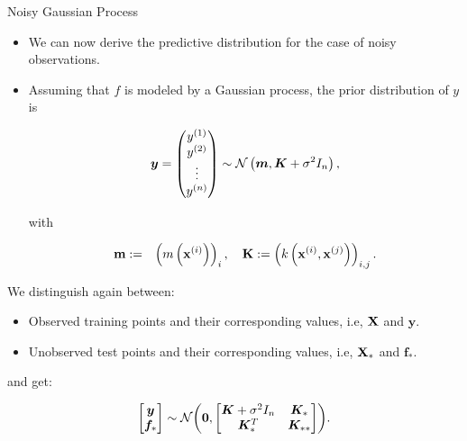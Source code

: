\begin{frame}[c,allowframebreaks]{Noisy Gaussian Process}
\framebreak

\begin{itemize}
  \item We can now derive the predictive distribution for the case of noisy observations. 
  \item Assuming that $f$ is modeled by a Gaussian process, the prior distribution of $y$ is
  
  $$\bm{y} = \begin{pmatrix} y^{(1)} \\ y^{(2)} \\ \vdots \\ y^{(n)} \end{pmatrix} \sim \mathcal{N}\left(\bm{m}, \bm{K} + \sigma^2 I_n \right),$$
  
  with

  \begin{eqnarray*}
    \textbf{m} &:=& \left(m\left(\mathbf{x}^{(i)}\right)\right)_{i}, \quad
    \textbf{K} := \left(k\left(\mathbf{x}^{(i)}, \mathbf{x}^{(j)}\right)\right)_{i,j}. 
  \end{eqnarray*}
\end{itemize}

\framebreak 


We distinguish again between:

\lz

\begin{itemize}
    \item Observed training points and their corresponding values, i.e, $\mathbf{X}$ and $\bm{y}$.
\item Unobserved test points and their corresponding values, i.e, $\mathbf{X}_*$ and $\bm{f}_*$.
\end{itemize}

\lz

and get:
  
  $$
  \begin{bmatrix}
  \bm{y} \\
  \bm{f}_*
  \end{bmatrix} \sim  
  \mathcal{N}\biggl(\bm{0}, \begin{bmatrix} \bm{K} + \sigma^2 I_n & \bm{K}_* \\ \bm{K}_*^T & \bm{K}_{**} \end{bmatrix}\biggr).
  $$

\framebreak
\begin{itemize}


\end{itemize}
\end{frame}
